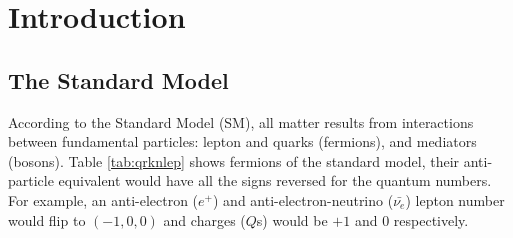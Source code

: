 \chapter{Introduction}
\label{ch:intro}

\section{The Standard Model}
According to the Standard Model (SM), all matter results from interactions between fundamental particles: lepton and quarks (fermions), and mediators (bosons).
Table \ref{tab:qrknlep} shows fermions of the standard model, their anti-particle equivalent would have all the signs reversed for the quantum numbers. For example, an anti-electron (\(e^+\)) and anti-electron-neutrino (\(\bar{\nu_e}\)) lepton number would flip to \((-1, 0, 0)\) and charges (\(Q\)s) would be \(+1\) and 0 respectively.

